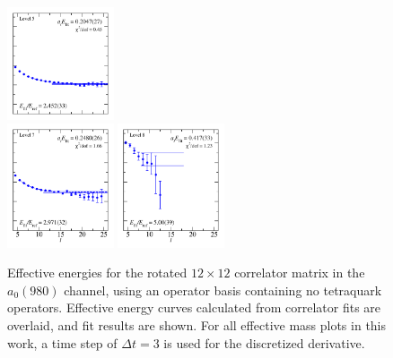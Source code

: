 \begin{figure}
  \includegraphics[width=0.28\textwidth]{figures/spectrum_a1gm/no_tq/fits/fit_4.pdf}\\
  \includegraphics[width=0.28\textwidth]{figures/spectrum_a1gm/no_tq/fits/fit_7.pdf}
  \includegraphics[width=0.28\textwidth]{figures/spectrum_a1gm/no_tq/fits/fit_8.pdf}\\
  \caption{Effective energies for the rotated $12\times 12$ correlator matrix in the $a_0(980)$ channel, using an operator basis containing no tetraquark operators. Effective energy curves calculated from correlator fits are overlaid, and fit results are shown. For all effective mass plots in this work, a time step of $\Delta t = 3$ is used for the discretized derivative.}
  \label{fig:a0_no_tq_grid}
\end{figure}

